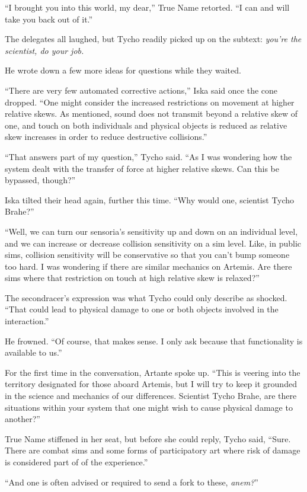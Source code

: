 ``I brought you into this world, my dear,'' True Name retorted. ``I can and will take you back out of it.''

The delegates all laughed, but Tycho readily picked up on the subtext: \emph{you're the scientist, do your job.}

He wrote down a few more ideas for questions while they waited.

``There are very few automated corrective actions,'' Iska said once the cone dropped. ``One might consider the increased restrictions on movement at higher relative skews. As mentioned, sound does not transmit beyond a relative skew of one, and touch on both individuals and physical objects is reduced as relative skew increases in order to reduce destructive collisions.''

``That answers part of my question,'' Tycho said. ``As I was wondering how the system dealt with the transfer of force at higher relative skews. Can this be bypassed, though?''

Iska tilted their head again, further this time. ``Why would one, scientist Tycho Brahe?''

``Well, we can turn our sensoria's sensitivity up and down on an individual level, and we can increase or decrease collision sensitivity on a sim level. Like, in public sims, collision sensitivity will be conservative so that you can't bump someone too hard. I was wondering if there are similar mechanics on Artemis. Are there sims where that restriction on touch at high relative skew is relaxed?''

The secondracer's expression was what Tycho could only describe as shocked. ``That could lead to physical damage to one or both objects involved in the interaction.''

He frowned. ``Of course, that makes sense. I only ask because that functionality is available to us.''

For the first time in the conversation, Artante spoke up. ``This is veering into the territory designated for those aboard Artemis, but I will try to keep it grounded in the science and mechanics of our differences. Scientist Tycho Brahe, are there situations within your system that one might wish to cause physical damage to another?''

True Name stiffened in her seat, but before she could reply, Tycho said, ``Sure. There are combat sims and some forms of participatory art where risk of damage is considered part of of the experience.''

``And one is often advised or required to send a fork to these, \emph{anem?}''

